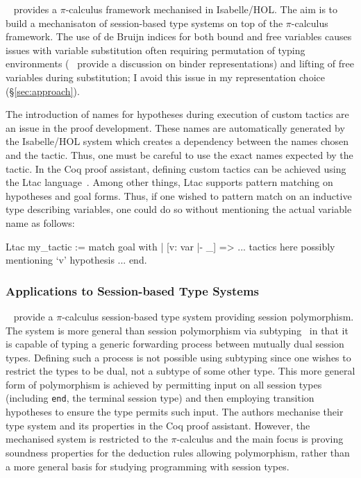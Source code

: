 \citeauthor{Gay:2001:FFP}~\cite{Gay:2001:FFP} provides a $\pi$-calculus
framework mechanised in Isabelle/HOL. The aim is to build a mechanisaton of
session-based type systems on top of the $\pi$-calculus framework. The use of
de Bruijn indices for both bound and free variables causes issues with
variable substitution often requiring permutation of typing environments
(\citeauthor{Aydemir:2008:EFM}~\cite{Aydemir:2008:EFM} provide a discussion on
binder representations) and lifting of free variables during substitution; I
avoid this issue in my representation choice (\S \ref{sec:approach}).

The introduction of names for hypotheses during execution of custom tactics
are an issue in the proof development. These names are automatically generated
by the Isabelle/HOL system which creates a dependency between the names chosen
and the tactic. Thus, one must be careful to use the exact names expected by
the tactic. In the Coq proof assistant, defining custom tactics can be
achieved using the Ltac language~\cite{Delahaye:2000:TLS}. Among other things,
Ltac supports pattern matching on hypotheses and goal forms. Thus, if one
wished to pattern match on an inductive type describing variables, one could
do so without mentioning the actual variable name as follows:

\begin{coq}
Ltac my_tactic :=
  match goal with
  | [v: var |- _] =>
    ... tactics here possibly mentioning `v' hypothesis ...
  end.
\end{coq}

\subsubsection{Applications to Session-based Type Systems}\label{sec:asts}

\citeauthor{Goto:2014}~\cite{Goto:2014} provide a $\pi$-calculus session-based
type system providing session polymorphism. The system is more general than
session polymorphism via subtyping~\cite{Gay:2005:SST} in that it is capable
of typing a generic forwarding process between mutually dual session
types. Defining such a process is not possible using subtyping since one
wishes to restrict the types to be dual, not a subtype of some other
type. This more general form of polymorphism is achieved by permitting input
on all session types (including \lstinline{end}, the terminal session type)
and then employing transition hypotheses to ensure the type permits such
input. The authors mechanise their type system and its properties in the Coq
proof assistant. However, the mechanised system is restricted to the
$\pi$-calculus and the main focus is proving soundness properties for the
deduction rules allowing polymorphism, rather than a more general basis for
studying programming with session types.
